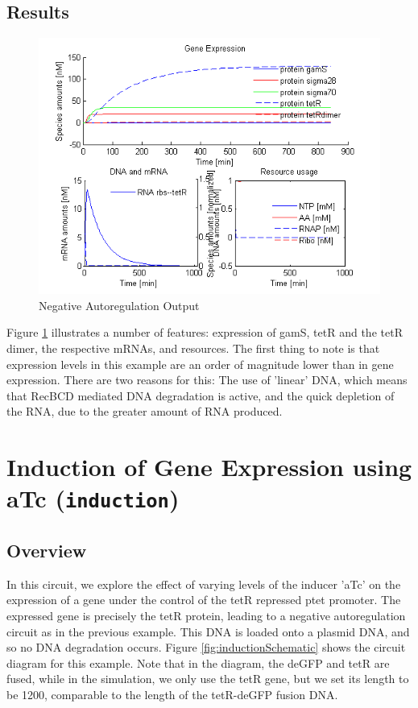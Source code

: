 \documentclass[english]{report}
\begin{document}
		
		\subsection{Results}	
		
		\begin{figure}
		\begin{center}
		\includegraphics[width=\textwidth]{NegativeAutoregulationPlotActuallyProducedByCode.png} 
		\caption{Negative Autoregulation Output}
		\label{fig:negautoreg}
		\end{center}
		
		\end{figure}
		Figure \ref{fig:negautoreg} illustrates a number of features: expression of gamS, tetR and the tetR dimer, the respective mRNAs, and resources. The first thing to note is that expression levels in this example are an order of magnitude lower than in gene expression. There are two reasons for this: The use of 'linear' DNA, which means that RecBCD mediated DNA degradation is active, and the quick depletion of the RNA, due to the greater amount of RNA produced.  
		
	\section{Induction of Gene Expression using aTc (\texttt{induction})}
		\subsection{Overview}
		In this circuit, we explore the effect of varying levels of the inducer 'aTc' on the expression of a gene under the control of the tetR repressed ptet promoter. The expressed gene is precisely the tetR protein, leading to a negative autoregulation circuit as in the previous example. This DNA is loaded onto a plasmid DNA, and so no DNA degradation occurs. Figure \ref{fig:inductionSchematic} shows the circuit diagram for this example. Note that in the diagram, the deGFP and tetR are fused, while in the simulation, we only use the tetR gene, but we set its length to be 1200, comparable to the length of the tetR-deGFP fusion DNA. \\ 
\end{document}
